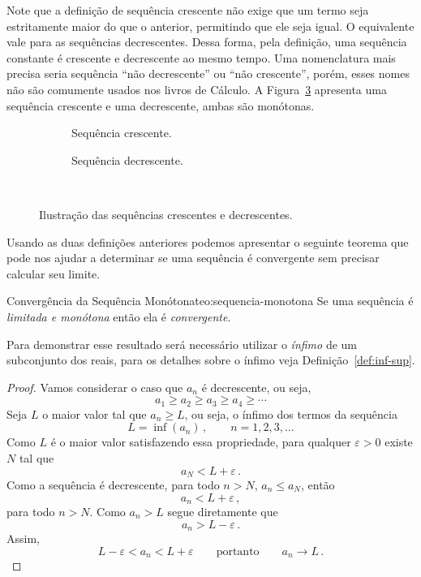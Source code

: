 Note que a definição de sequência crescente não exige que um termo
seja estritamente maior do que o anterior, permitindo que ele seja igual.
O equivalente vale para as sequências decrescentes.
Dessa forma, pela definição, uma sequência constante é crescente e decrescente
ao mesmo tempo.
Uma nomenclatura mais precisa seria sequência ``não decrescente'' ou ``não crescente'',
porém, esses nomes não são comumente usados nos livros de Cálculo.
A Figura~\ref{fig:sequencia_monotona} apresenta uma sequência crescente
e uma decrescente, ambas são monótonas.

\begin{figure}
  \centering
  \begin{subfigure}[t]{0.5\linewidth}
    \centering
    
    \caption{Sequência crescente.}
    \label{fig:sequencia_monotona_1}
  \end{subfigure}%
  \begin{subfigure}[t]{0.5\linewidth}
    \centering
    
    \caption{Sequência decrescente.}
    \label{fig:sequencia_monotona_2}
  \end{subfigure}\\
  \caption{Ilustração das sequências crescentes e decrescentes.}
  \label{fig:sequencia_monotona}
\end{figure}

Usando as duas definições anteriores podemos apresentar o seguinte teorema
que pode nos ajudar a determinar se uma sequência é convergente sem
precisar calcular seu limite.

\begin{teorema}{Convergência da Sequência Monótona}{teo:sequencia-monotona}
  Se uma sequência é \emph{limitada e monótona} então ela é
  \emph{convergente}.
\end{teorema}

Para demonstrar esse resultado será necessário utilizar o
\emph{ínfimo} de um subconjunto dos reais,
para os detalhes sobre o ínfimo veja Definição~\ref{def:inf-sup}.

\begin{proof}
  Vamos considerar o caso que $a_n$ é decrescente, ou seja,
  \[
    a_1 \geq a_2 \geq a_3 \geq a_4 \geq \cdots
  \]
  Seja $L$ o maior valor tal que $a_n\geq L$,
  ou seja, o ínfimo dos termos da sequência
  \[
    L = \inf(a_n) \,, \qquad n = 1, 2, 3, \dots
  \]
  Como $L$ é o maior valor satisfazendo essa propriedade,
  para qualquer $\varepsilon>0$ existe $N$ tal que
  \[
    a_{N} <  L + \varepsilon   \,.
  \]
  Como a sequência é decrescente, para todo $n>N$, $a_n\leq a_N$, então
  \[
    a_{n} < L+\varepsilon  \,,
  \]
  para todo $n>N$.
  Como $a_n>L$ segue diretamente que
  \[
    a_n > L-\varepsilon  \,.
  \]
  Assim,
  \[
    L-\varepsilon < a_{n} < L+\varepsilon
    \qquad\text{portanto}\qquad
    a_n \to L     \,.
  \]
\end{proof}

